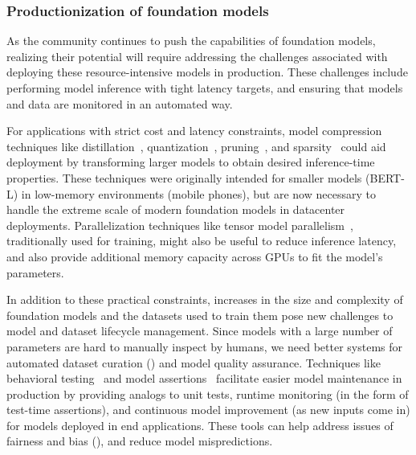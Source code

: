 \subsubsection{Productionization of foundation models}

As the community continues to push the capabilities of foundation models, realizing their potential will require addressing the challenges associated with deploying these resource-intensive models in production. These challenges include performing model inference with tight latency targets, and ensuring that models and data are monitored in an automated way.

For applications with strict cost and latency constraints, model compression techniques like distillation~\citep{hinton2015distilling, li2020train, sanh2019distilbert}, quantization~\citep{polino2018model, gholami2021survey, zhou2018adaptive}, pruning~\citep{lecun1990optimal, gordon2020compressing, mccarley2019structured, wang2019structured, sajjad2020effect}, and sparsity~\citep{gale2020sparse, Elsen_2020_CVPR} could aid deployment by transforming larger models to obtain desired inference-time properties. These techniques were originally intended for smaller models (\eg BERT-L) in low-memory environments (\eg mobile phones), but are now necessary to handle the extreme scale of modern foundation models in datacenter deployments. Parallelization techniques like tensor model parallelism~\cite{shoeybi2019megatronlm}, traditionally used for training, might also be useful to reduce inference latency, and also provide additional memory capacity across GPUs to fit the model's parameters.

In addition to these practical constraints, increases in the size and complexity of foundation models and the datasets used to train them pose new challenges to model and dataset lifecycle management. Since models with a large number of parameters are hard to manually inspect by humans, we need better systems for automated dataset curation () and model quality assurance. Techniques like behavioral testing~\citep{ribeiro2020beyond} and model assertions~\citep{kang2020model} facilitate easier model maintenance in production by providing analogs to unit tests, runtime monitoring (in the form of test-time assertions), and continuous model improvement (as new inputs come in) for models deployed in end applications. These tools can help address issues of fairness and bias (), and reduce model mispredictions.
